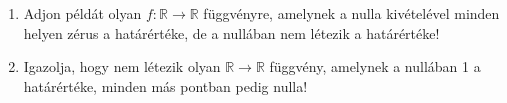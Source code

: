 \documentclass[11pt]{scrartcl}
\begin{document}
\begin{enumerate}
	\item Adjon példát olyan $f : \mathbb{R} \to \mathbb{R}$ függvényre, amelynek
	      a nulla kivételével minden helyen zérus a határértéke, de a nullában nem
	      létezik a határértéke!

	\item Igazolja, hogy nem létezik olyan $\mathbb{R} \to \mathbb{R}$ függvény,
	      amelynek a nullában 1 a határértéke, minden más pontban pedig nulla!
\end{enumerate}
\end{document}
